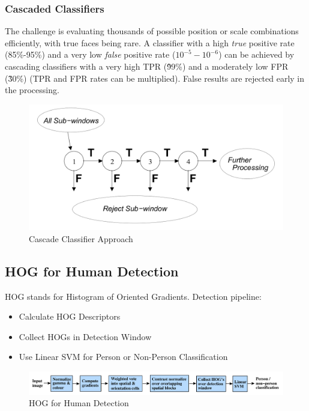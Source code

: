 \subsubsection{Cascaded Classifiers}
The challenge is evaluating thousands of possible position or scale combinations efficiently, with true faces being rare.
A classifier with a high \emph{true} positive rate (85\%-95\%) and a very low \emph{false} positive rate ($10^{-5}-10^{-6}$)
can be achieved by cascading classifiers with a very high TPR (\~99\%) and a moderately low FPR (\~30\%) (TPR and FPR rates can be multiplied).
False results are rejected early in the processing.

\begin{figure}[h]
	\centering
	\includegraphics[width=0.6\linewidth]{img/cascade_classifier_approach}
	\caption{Cascade Classifier Approach}
\end{figure}

\subsection{HOG for Human Detection}
HOG stands for Histogram of Oriented Gradients. Detection pipeline:
\begin{itemize}
	\item Calculate HOG Descriptors
	\item Collect HOGs in Detection Window
	\item Use Linear SVM for Person or Non-Person Classification
\end{itemize}

\begin{figure}[h]
	\centering
	\includegraphics[width=0.8\linewidth]{img/hog_human_detection}
	\caption{HOG for Human Detection}
\end{figure}


